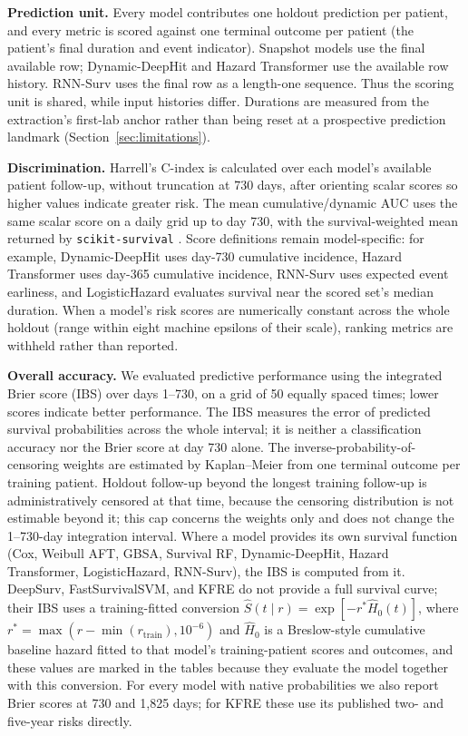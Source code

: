 \textbf{Prediction unit.} Every model contributes one holdout prediction per patient, and every metric is scored against one terminal outcome per patient (the patient's final duration and event indicator). Snapshot models use the final available row; Dynamic-DeepHit and Hazard Transformer use the available row history. RNN-Surv uses the final row as a length-one sequence. Thus the scoring unit is shared, while input histories differ. Durations are measured from the extraction's first-lab anchor rather than being reset at a prospective prediction landmark (Section~\ref{sec:limitations}).

\textbf{Discrimination.} Harrell's C-index is calculated over each model's available patient follow-up, without truncation at 730 days, after orienting scalar scores so higher values indicate greater risk. The mean cumulative/dynamic AUC uses the same scalar score on a daily grid up to day 730, with the survival-weighted mean returned by \texttt{scikit-survival} \citep{polsterl2020sksurv}. Score definitions remain model-specific: for example, Dynamic-DeepHit uses day-730 cumulative incidence, Hazard Transformer uses day-365 cumulative incidence, RNN-Surv uses expected event earliness, and LogisticHazard evaluates survival near the scored set's median duration. When a model's risk scores are numerically constant across the whole holdout (range within eight machine epsilons of their scale), ranking metrics are withheld rather than reported.

\textbf{Overall accuracy.} We evaluated predictive performance using the integrated Brier score (IBS) over days 1--730, on a grid of 50 equally spaced times; lower scores indicate better performance. The IBS measures the error of predicted survival probabilities across the whole interval; it is neither a classification accuracy nor the Brier score at day 730 alone. The inverse-probability-of-censoring weights are estimated by Kaplan--Meier from one terminal outcome per training patient. Holdout follow-up beyond the longest training follow-up is administratively censored at that time, because the censoring distribution is not estimable beyond it; this cap concerns the weights only and does not change the 1--730-day integration interval. Where a model provides its own survival function (Cox, Weibull AFT, GBSA, Survival RF, Dynamic-DeepHit, Hazard Transformer, LogisticHazard, RNN-Surv), the IBS is computed from it. DeepSurv, FastSurvivalSVM, and KFRE do not provide a full survival curve; their IBS uses a training-fitted conversion $\hat S(t\mid r)=\exp[-r^*\hat H_0(t)]$, where $r^*=\max(r-\min(r_{\mathrm{train}}),10^{-6})$ and $\hat H_0$ is a Breslow-style cumulative baseline hazard fitted to that model's training-patient scores and outcomes, and these values are marked in the tables because they evaluate the model together with this conversion. For every model with native probabilities we also report Brier scores at 730 and 1{,}825 days; for KFRE these use its published two- and five-year risks directly.

